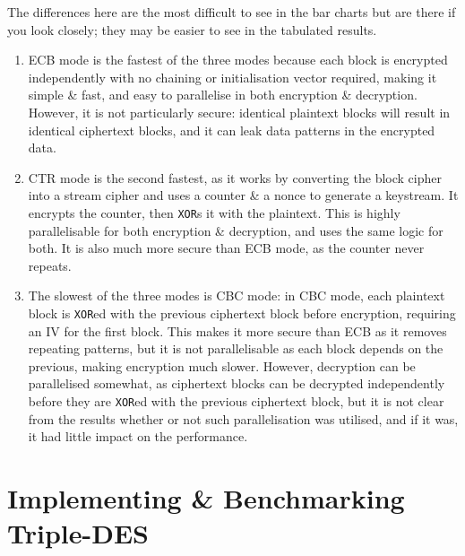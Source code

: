 \documentclass[a4paper]{article}
\begin{document}
The differences here are the most difficult to see in the bar charts but are there if you look closely; they may be easier to see in the tabulated results.
\begin{enumerate}
    \item   ECB mode is the fastest of the three modes because each block is encrypted independently with no chaining or initialisation vector required, making it simple \& fast, and easy to parallelise in both encryption \& decryption.
            However, it is not particularly secure: identical plaintext blocks will result in identical ciphertext blocks, and it can leak data patterns in the encrypted data.

    \item   CTR mode is the second fastest, as it works by converting the block cipher into a stream cipher and uses a counter \& a nonce to generate a keystream.
            It encrypts the counter, then \verb|XOR|s it with the plaintext.
            This is highly parallelisable for both encryption \& decryption, and uses the same logic for both.
            It is also much more secure than ECB mode, as the counter never repeats.

    \item   The slowest of the three modes is CBC mode:
            in CBC mode, each plaintext block is \verb|XOR|ed with the previous ciphertext block before encryption, requiring an IV for the first block.
            This makes it more secure than ECB as it removes repeating patterns, but it is not parallelisable as each block depends on the previous, making encryption much slower.
            However, decryption can be parallelised somewhat, as ciphertext blocks can be decrypted independently before they are \verb|XOR|ed with the previous ciphertext block, but it is not clear from the results whether or not such parallelisation was utilised, and if it was, it had little impact on the performance.
\end{enumerate}

\section{Implementing \& Benchmarking Triple-DES}
\end{document}
